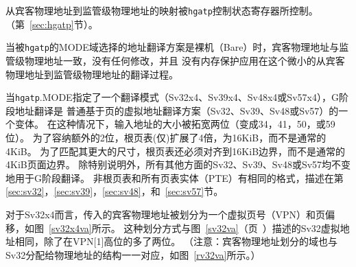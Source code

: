 从宾客物理地址到监管级物理地址的映射被{\tt hgatp}控制状态寄存器所控制。（第~\ref{sec:hgatp}节）。

当被{\tt hgatp}的MODE域选择的地址翻译方案是裸机（Bare）时，宾客物理地址与监管级物理地址一致，没有任何修改，并且
没有内存保护应用在这个微小的从宾客物理地址到监管级物理地址的翻译过程。

当{\tt hgatp}.MODE指定了一个翻译模式（Sv32x4、Sv39x4、Sv48x4或Sv57x4），G阶段地址翻译是
普通基于页的虚拟地址翻译方案（Sv32、Sv39、Sv48或Sv57）的一个变体。
在这种情况下，输入地址的大小被拓宽两位（变成34，41，50，或59位）。
为了容纳额外的2位，根页表(仅)扩展了4倍，为16KiB，而不是通常的4KiB。
为了匹配其更大的尺寸，根页表还必须对齐到16KiB边界，而不是通常的4KiB页面边界。
除特别说明外，所有其他方面的Sv32、Sv39、Sv48或Sv57均不变地用于G阶段翻译。
非根页表和所有页表实体（PTE）有相同的格式，描述在第\ref{sec:sv32}，\ref{sec:sv39}，\ref{sec:sv48}，和~\ref{sec:sv57}节。

对于Sv32x4而言，传入的宾客物理地址被划分为一个虚拟页号（VPN）和页偏移，如图~\ref{sv32x4va}所示。
这种划分方式与图~\ref{sv32va}（页~\pageref{sv32va}）描述的Sv32虚拟地址相同，除了在VPN[1]高位的多了两位。
（注意：宾客物理地址划分的域也与Sv32分配给物理地址的结构一一对应，如图~\ref{rv32va}所示。）

